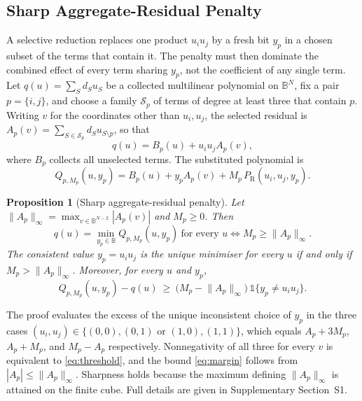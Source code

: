 \documentclass{ieeeaccess}
\newtheorem{proposition}{Proposition}
\newcommand{\B}{\mathbb{B}}
\newcommand{\PR}{P_{\mathrm{R}}}
\newcommand{\norminf}[1]{\lVert #1 \rVert_{\infty}}
\begin{document}
\subsection{Sharp Aggregate-Residual Penalty}
\label{sec:reduction:penalty}

A selective reduction replaces one product $u_iu_j$ by a fresh bit $y_p$ in a chosen
subset of the terms that contain it. The penalty must then dominate the combined effect
of every term sharing $y_p$, not the coefficient of any single term. Let $q(u)=\sum_S d_S u_S$
be a collected multilinear polynomial on $\B^N$, fix a pair $p=\{i,j\}$, and choose a family
$\mathcal{S}_p$ of terms of degree at least three that contain $p$. Writing $v$ for the
coordinates other than $u_i,u_j$, the selected residual is
$A_p(v)=\sum_{S\in\mathcal{S}_p}d_S u_{S\setminus p}$, so that
\begin{equation}
q(u)=B_p(u)+u_iu_jA_p(v),
\label{eq:split}
\end{equation}
where $B_p$ collects all unselected terms. The substituted polynomial is
\begin{equation}
Q_{p,M_p}(u,y_p)=B_p(u)+y_pA_p(v)+M_p\,\PR(u_i,u_j,y_p).
\label{eq:substituted}
\end{equation}

\begin{proposition}[Sharp aggregate-residual penalty]
\label{prop:sharp}
Let $\norminf{A_p}=\max_{v\in\B^{N-2}}|A_p(v)|$ and $M_p\ge 0$. Then
\begin{equation}
q(u)=\min_{y_p\in\B}Q_{p,M_p}(u,y_p)\ \text{for every }u
\iff M_p\ge\norminf{A_p}.
\label{eq:threshold}
\end{equation}
The consistent value $y_p=u_iu_j$ is the unique minimiser for every $u$ if and only if
$M_p>\norminf{A_p}$. Moreover, for every $u$ and $y_p$,
\begin{equation}
Q_{p,M_p}(u,y_p)-q(u)\ \ge\ \bigl(M_p-\norminf{A_p}\bigr)\,\mathbb{1}\{y_p\neq u_iu_j\}.
\label{eq:margin}
\end{equation}
\end{proposition}

The proof evaluates the excess of the unique inconsistent choice of $y_p$ in the three cases
$(u_i,u_j)\in\{(0,0),(0,1)\text{ or }(1,0),(1,1)\}$, which equals $A_p+3M_p$, $A_p+M_p$, and
$M_p-A_p$ respectively. Nonnegativity of all three for every $v$ is equivalent to
\eqref{eq:threshold}, and the bound \eqref{eq:margin} follows from $|A_p|\le\norminf{A_p}$.
Sharpness holds because the maximum defining $\norminf{A_p}$ is attained on the finite cube.
Full details are given in Supplementary Section~S1.
\end{document}

